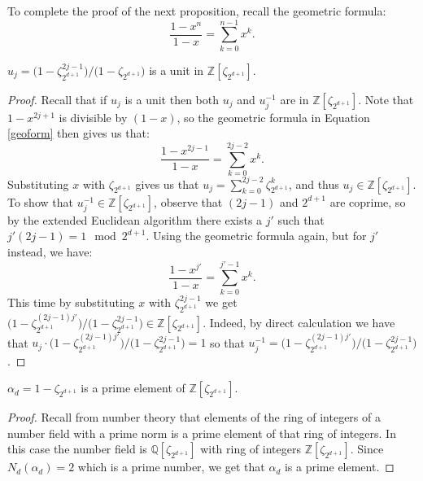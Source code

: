 \documentclass[12pt]{dalthesis}
\begin{document}
To complete the proof of the next proposition, recall the geometric formula:
\begin{equation}
\label{geoform}
\frac{1-x^{n}}{1-x} = \sum\limits_{k=0}^{n-1} x^k.
\end{equation}

\begin{proposition}
\label{unit}
$u_j = \big( 1 - \zeta_{2^{d+1}}^{2j - 1} \big)/ \big( 1 - \zeta_{2^{d+1}} \big)$ is a unit in $\mathbb{Z}[\zeta_{2^{d+1}}]$. 
\end{proposition}
\begin{proof}
Recall that if $u_j$ is a unit then both $u_j$ and $u_j^{-1}$ are in $\mathbb{Z}[\zeta_{2^{d+1}}]$. Note that $1-x^{2j+1}$ is divisible by $(1-x)$, so the geometric formula in Equation \ref{geoform} then gives us that:
\begin{equation*}
\frac{1-x^{2j-1}}{1-x} = \sum\limits_{k=0}^{2j-2} x^k.
\end{equation*}
Substituting $x$ with $\zeta_{2^{d+1}}$ gives us that $u_j = \sum\limits_{k=0}^{2j-2} \zeta_{2^{d+1}}^k$, and thus $u_j \in \mathbb{Z}[\zeta_{2^{d+1}}]$. To show that $u_j^{-1} \in \mathbb{Z}[\zeta_{2^{d+1}}]$, observe that $(2j-1)$ and $2^{d+1}$ are coprime, so by the extended Euclidean algorithm there exists a $j'$ such that $j'(2j-1) = 1 \mod 2^{d+1}$. Using the geometric formula again, but for $j'$ instead, we have:
\begin{equation*}
\frac{1-x^{j'}}{1-x} = \sum\limits_{k=0}^{j'-1} x^k.
\end{equation*}
This time by substituting $x$ with $\zeta_{2^{d+1}}^{2j-1}$ we get $\big( 1 - \zeta_{2^{d+1}}^{(2j - 1)j'} \big)/ \big( 1 - \zeta_{2^{d+1}}^{2j-1} \big) \in \mathbb{Z}[\zeta_{2^{d+1}}]$. Indeed, by direct calculation we have that $u_j \cdot \big( 1 - \zeta_{2^{d+1}}^{(2j - 1)j'} \big)/ \big( 1 - \zeta_{2^{d+1}}^{2j-1} \big) = 1$ so that $u_j^{-1} = \big( 1 - \zeta_{2^{d+1}}^{(2j - 1)j'} \big)/ \big( 1 - \zeta_{2^{d+1}}^{2j-1} \big)$.
\end{proof}

\begin{proposition}
\label{alphaprime}
$\alpha_d = 1 - \zeta_{2^{d+1}}$ is a prime element of $\mathbb{Z}[\zeta_{2^{d+1}}]$.
\end{proposition}
\begin{proof}
Recall from number theory that elements of the ring of integers of a number field with a prime norm is a prime element of that ring of integers. In this case the number field is $\mathbb{Q}[\zeta_{2^{d+1}}]$ with ring of integers $\mathbb{Z}[\zeta_{2^{d+1}}]$. Since $N_d(\alpha_d) = 2$ which is a prime number, we get that $\alpha_d$ is a prime element.
\end{proof}
\end{document}
